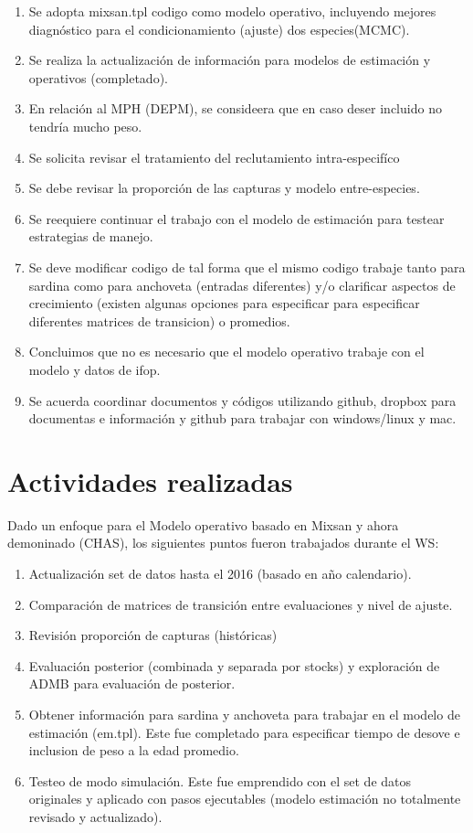 \documentclass[]{article}
\begin{document}
\begin{enumerate}
\def\labelenumi{\arabic{enumi}.}
\item
  Se adopta mixsan.tpl codigo como modelo operativo, incluyendo mejores
  diagnóstico para el condicionamiento (ajuste) dos especies(MCMC).
\item
  Se realiza la actualización de información para modelos de estimación
  y operativos (completado).
\item
  En relación al MPH (DEPM), se consideera que en caso deser incluido no
  tendría mucho peso.
\item
  Se solicita revisar el tratamiento del reclutamiento intra-especifíco
\item
  Se debe revisar la proporción de las capturas y modelo entre-especies.
\item
  Se reequiere continuar el trabajo con el modelo de estimación para
  testear estrategias de manejo.
\item
  Se deve modificar codigo de tal forma que el mismo codigo trabaje
  tanto para sardina como para anchoveta (entradas diferentes) y/o
  clarificar aspectos de crecimiento (existen algunas opciones para
  especificar para especificar diferentes matrices de transicion) o
  promedios.
\item
  Concluimos que no es necesario que el modelo operativo trabaje con el
  modelo y datos de ifop.
\item
  Se acuerda coordinar documentos y códigos utilizando github, dropbox
  para documentas e información y github para trabajar con windows/linux
  y mac.
\end{enumerate}

\section{Actividades realizadas}\label{actividades-realizadas}

Dado un enfoque para el Modelo operativo basado en Mixsan y ahora
demoninado (CHAS), los siguientes puntos fueron trabajados durante el
WS:

\begin{enumerate}
\def\labelenumi{\arabic{enumi}.}
\item
  Actualización set de datos hasta el 2016 (basado en año calendario).
\item
  Comparación de matrices de transición entre evaluaciones y nivel de
  ajuste.
\item
  Revisión proporción de capturas (históricas)
\item
  Evaluación posterior (combinada y separada por stocks) y exploración
  de ADMB para evaluación de posterior.
\item
  Obtener información para sardina y anchoveta para trabajar en el
  modelo de estimación (em.tpl). Este fue completado para especificar
  tiempo de desove e inclusion de peso a la edad promedio.
\item
  Testeo de modo simulación. Este fue emprendido con el set de datos
  originales y aplicado con pasos ejecutables (modelo estimación no
  totalmente revisado y actualizado).
\end{enumerate}
\end{document}
